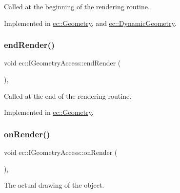 Called at the beginning of the rendering routine. 



Implemented in \mbox{\hyperlink{classec_1_1_geometry_aeca5f0e52e7c2e4b352ede1a6e7c3f5b}{ec\+::\+Geometry}}, and \mbox{\hyperlink{classec_1_1_dynamic_geometry_ae4eb49e852a4c300325a288bf9ea4408}{ec\+::\+Dynamic\+Geometry}}.

\mbox{\label{classec_1_1_i_geometry_access_a6d3b9c34a8b73aeac26663ef349ce41f}} 
\subsubsection{\texorpdfstring{end\+Render()}{endRender()}}
{\footnotesize\ttfamily void ec\+::\+I\+Geometry\+Access\+::end\+Render (\begin{DoxyParamCaption}{ }\end{DoxyParamCaption})\hspace{0.3cm}{\ttfamily [protected]}, {}}



Called at the end of the rendering routine. 



Implemented in \mbox{\hyperlink{classec_1_1_geometry_ae0352702162501df185517e84c3b02bd}{ec\+::\+Geometry}}.

\mbox{\label{classec_1_1_i_geometry_access_a2ee418c9fa4eb266347bae2f0ef8095b}} 
\subsubsection{\texorpdfstring{on\+Render()}{onRender()}}
{\footnotesize\ttfamily void ec\+::\+I\+Geometry\+Access\+::on\+Render (\begin{DoxyParamCaption}{ }\end{DoxyParamCaption})\hspace{0.3cm}{\ttfamily [protected]}, {}}



The actual drawing of the object. 



